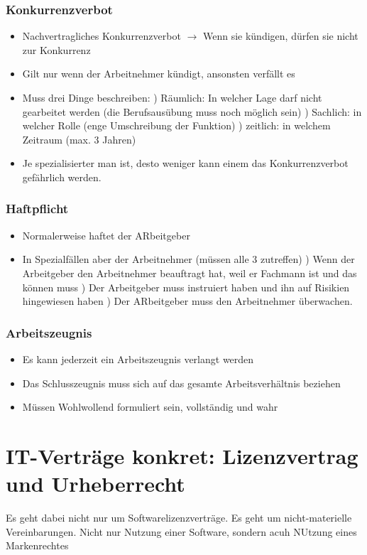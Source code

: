 \documentclass{report}
\theoremstyle{definition}
\theoremstyle{example}
\begin{document}
\subsection{Konkurrenzverbot}
\begin{itemize}
   \item Nachvertragliches Konkurrenzverbot $\rightarrow$ Wenn sie kündigen, dürfen sie nicht zur Konkurrenz
   \item Gilt nur wenn der Arbeitnehmer kündigt, ansonsten verfällt es
   \item Muss drei Dinge beschreiben:
   ) Räumlich: In welcher Lage darf nicht gearbeitet werden (die Berufsausübung muss noch möglich sein)
   ) Sachlich: in welcher Rolle (enge Umschreibung der Funktion)
   ) zeitlich: in welchem Zeitraum (max. 3 Jahren) 
   \item Je spezialisierter man ist, desto weniger kann einem das Konkurrenzverbot gefährlich werden.
\end{itemize}

\subsection{Haftpflicht}
\begin{itemize}
   \item Normalerweise haftet der ARbeitgeber
   \item In Spezialfällen aber der Arbeitnehmer (müssen alle 3 zutreffen)
   ) Wenn der Arbeitgeber den Arbeitnehmer beauftragt hat, weil er Fachmann ist und das können muss
   ) Der Arbeitgeber muss instruiert haben und ihn auf Risikien hingewiesen haben
   ) Der ARbeitgeber muss den Arbeitnehmer überwachen. 
\end{itemize}

\subsection{Arbeitszeugnis}
\begin{itemize}
   \item Es kann jederzeit ein Arbeitszeugnis verlangt werden
   \item Das Schlusszeugnis muss sich auf das gesamte Arbeitsverhältnis beziehen
   \item Müssen Wohlwollend formuliert sein, vollständig und wahr
\end{itemize}



\chapter{IT-Verträge konkret: Lizenzvertrag und Urheberrecht}
Es geht dabei nicht nur um Softwarelizenzverträge. Es geht um nicht-materielle Vereinbarungen. Nicht nur Nutzung einer Software, sondern acuh NUtzung eines Markenrechtes
\end{document}

